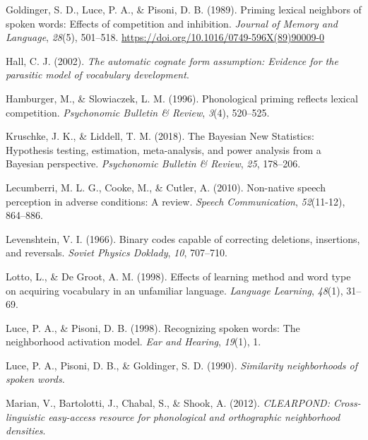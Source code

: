 \documentclass[
]{article}
\newlength{\cslhangindent}
\newenvironment{CSLReferences}[2] %
 {\begin{list}{}{%
  \setlength{\itemindent}{0pt}
  \setlength{\leftmargin}{0pt}
  \setlength{\parsep}{0pt}
  \ifodd #1
   \setlength{\leftmargin}{\cslhangindent}
   \setlength{\itemindent}{-1\cslhangindent}
  \fi
  \setlength{\itemsep}{#2\baselineskip}}}
 {\end{list}}
\begin{document}
\begin{CSLReferences}{1}{0}
Goldinger, S. D., Luce, P. A., \& Pisoni, D. B. (1989). Priming lexical
neighbors of spoken words: {Effects} of competition and inhibition.
\emph{Journal of Memory and Language}, \emph{28}(5), 501--518.
\url{https://doi.org/10.1016/0749-596X(89)90009-0}

Hall, C. J. (2002). \emph{The automatic cognate form assumption:
Evidence for the parasitic model of vocabulary development}.

Hamburger, M., \& Slowiaczek, L. M. (1996). Phonological priming
reflects lexical competition. \emph{Psychonomic Bulletin \& Review},
\emph{3}(4), 520--525.

Kruschke, J. K., \& Liddell, T. M. (2018). The {Bayesian New
Statistics}: {Hypothesis} testing, estimation, meta-analysis, and power
analysis from a {Bayesian} perspective. \emph{Psychonomic Bulletin \&
Review}, \emph{25}, 178--206.

Lecumberri, M. L. G., Cooke, M., \& Cutler, A. (2010). Non-native speech
perception in adverse conditions: {A} review. \emph{Speech
Communication}, \emph{52}(11-12), 864--886.

Levenshtein, V. I. (1966). Binary codes capable of correcting deletions,
insertions, and reversals. \emph{Soviet Physics Doklady}, \emph{10},
707--710.

Lotto, L., \& De Groot, A. M. (1998). Effects of learning method and
word type on acquiring vocabulary in an unfamiliar language.
\emph{Language Learning}, \emph{48}(1), 31--69.

Luce, P. A., \& Pisoni, D. B. (1998). Recognizing spoken words: {The}
neighborhood activation model. \emph{Ear and Hearing}, \emph{19}(1), 1.

Luce, P. A., Pisoni, D. B., \& Goldinger, S. D. (1990). \emph{Similarity
neighborhoods of spoken words.}

Marian, V., Bartolotti, J., Chabal, S., \& Shook, A. (2012).
\emph{{CLEARPOND}: {Cross-linguistic} easy-access resource for
phonological and orthographic neighborhood densities}.


\end{CSLReferences}
\end{document}

